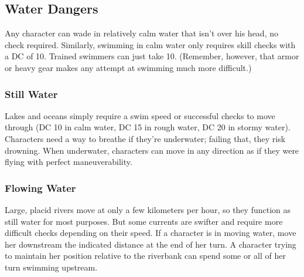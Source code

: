 \subsection{Water Dangers}
Any character can wade in relatively calm water that isn't over his head, no check required. Similarly, swimming in calm water only requires skill checks with a DC of 10. Trained swimmers can just take 10. (Remember, however, that armor or heavy gear makes any attempt at swimming much more difficult.)


\subsubsection{Still Water}
Lakes and oceans simply require a swim speed or successful  checks to move through (DC 10 in calm water, DC 15 in rough water, DC 20 in stormy water). Characters need a way to breathe if they're underwater; failing that, they risk drowning. When underwater, characters can move in any direction as if they were flying with perfect maneuverability.


\subsubsection{Flowing Water}
Large, placid rivers move at only a few kilometers per hour, so they function as still water for most purposes. But some currents are swifter and require more difficult  checks depending on their speed. If a character is in moving water, move her downstream the indicated distance at the end of her turn. A character trying to maintain her position relative to the riverbank can spend some or all of her turn swimming upstream.


